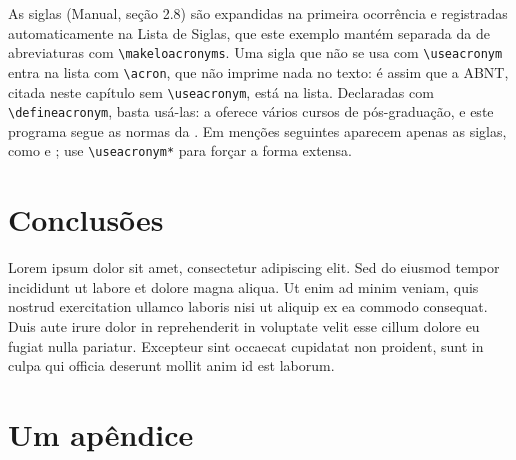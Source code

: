 \documentclass[dsc,setavermelha]{ufrj}
\theoremstyle{plain}
\theoremstyle{definition}
\theoremstyle{remark}
\begin{document}
  As siglas (Manual, seção 2.8) são expandidas na primeira ocorrência e registradas automaticamente na Lista de Siglas, que este exemplo mantém separada da de abreviaturas com \verb|\makeloacronyms|. Uma sigla que não se usa com \verb|\useacronym| entra na lista com \verb|\acron|, que não imprime nada no texto: é assim que a ABNT, citada neste capítulo sem \verb|\useacronym|, está na lista. Declaradas com \verb|\defineacronym|, basta usá-las: a  oferece vários cursos de pós-graduação, e este programa segue as normas da . Em menções seguintes aparecem apenas as siglas, como  e ; use \verb|\useacronym*| para forçar a forma extensa.

  \chapter{Conclusões}

  Lorem ipsum dolor sit amet, consectetur adipiscing elit. Sed do eiusmod tempor incididunt ut labore et dolore magna aliqua. Ut enim ad minim veniam, quis nostrud exercitation ullamco laboris nisi ut aliquip ex ea commodo consequat. Duis aute irure dolor in reprehenderit in voluptate velit esse cillum dolore eu fugiat nulla pariatur. Excepteur sint occaecat cupidatat non proident, sunt in culpa qui officia deserunt mollit anim id est laborum.

  \backmatter

  \nocite{patente-example,legislacao-example,m-norma,mapa-example,partitura-example}
  \nocite{jurisprudencia-example}
  \nocite{videogame-example,filme-example,semautor-example,semautorart-example}
  \nocite{m-4236,jornal-example}
  \printbibliography

  \printglossarylist

\appendix

\chapter{Um apêndice}
\end{document}
